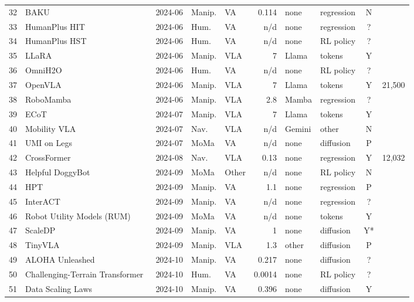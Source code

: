 \begin{longtable}{@{}r p{3.55cm} l l l r l l c r@{}}
32 & BAKU~\cite{ax240607539} & 2024-06 & Manip. & VA & 0.114 & none & regression & N & \\
33 & HumanPlus HIT~\cite{ax240610454} & 2024-06 & Hum. & VA & n/d & none & regression & ? & \\
34 & HumanPlus HST~\cite{ax240610454} & 2024-06 & Hum. & VA & n/d & none & RL policy & ? & \\
35 & LLaRA~\cite{ax240620095} & 2024-06 & Manip. & VLA & 7 & Llama & tokens & Y & \\
36 & OmniH2O~\cite{ax240608858} & 2024-06 & Hum. & VA & n/d & none & RL policy & ? & \\
37 & OpenVLA~\cite{ax240609246} & 2024-06 & Manip. & VLA & 7 & Llama & tokens & Y & 21,500\\
38 & RoboMamba~\cite{ax240604339} & 2024-06 & Manip. & VLA & 2.8 & Mamba & regression & ? & \\
39 & ECoT~\cite{ax240708693} & 2024-07 & Manip. & VLA & 7 & Llama & tokens & Y & \\
40 & Mobility VLA~\cite{ax240707775} & 2024-07 & Nav. & VLA & n/d & Gemini & other & N & \\
41 & UMI on Legs~\cite{ax240710353} & 2024-07 & MoMa & VA & n/d & none & diffusion & P & \\
42 & CrossFormer~\cite{ax240811812} & 2024-08 & Nav. & VLA & 0.13 & none & regression & Y & 12,032\\
43 & Helpful DoggyBot~\cite{ax241000231} & 2024-09 & MoMa & Other & n/d & none & RL policy & N & \\
44 & HPT~\cite{ax240920537} & 2024-09 & Manip. & VA & 1.1 & none & regression & P & \\
45 & InterACT~\cite{ax240907914} & 2024-09 & Manip. & VA & n/d & none & regression & ? & \\
46 & Robot Utility Models (RUM)~\cite{ax240905865} & 2024-09 & MoMa & VA & n/d & none & tokens & Y & \\
47 & ScaleDP~\cite{ax240914411} & 2024-09 & Manip. & VA & 1 & none & diffusion & Y* & \\
48 & TinyVLA~\cite{ax240912514} & 2024-09 & Manip. & VLA & 1.3 & other & diffusion & P & \\
49 & ALOHA Unleashed~\cite{ax241013126} & 2024-10 & Manip. & VA & 0.217 & none & diffusion & ? & \\
50 & Challenging-Terrain Transformer~\cite{ax241003654} & 2024-10 & Hum. & VA & 0.0014 & none & RL policy & ? & \\
51 & Data Scaling Laws~\cite{ax241018647} & 2024-10 & Manip. & VA & 0.396 & none & diffusion & Y & \\

\end{longtable}
